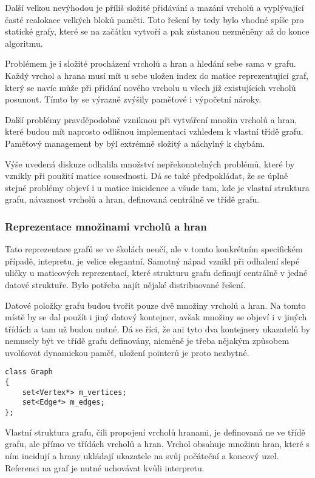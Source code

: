 \documentclass[11pt,twoside,a4paper]{book}
\begin{document}
Další velkou nevýhodou je příliš složité přidávání a mazání vrcholů a vyplývající časté realokace velkých bloků paměti. Toto řešení by tedy bylo vhodné spíše pro statické grafy, které se na začátku vytvoří a pak zůstanou nezměněny až do konce algoritmu.

Problémem je i složité procházení vrcholů a hran a hledání sebe sama v grafu. Každý vrchol a hrana musí mít u sebe uložen index do matice reprezentující graf, který se navíc může při přidání nového vrcholu u všech již existujících vrcholů posunout. Tímto by se výrazně zvýšily paměťové i výpočetní nároky.

Další problémy pravděpodobně vzniknou při vytváření množin vrcholů a hran, které budou mít naprosto odlišnou implementaci vzhledem k vlastní třídě grafu. Paměťový management by býl extrémně složitý a náchylný k chybám.

Výše uvedená diskuze odhalila množství nepřekonatelných problémů, které by vznikly při použití matice sousednosti. Dá se také předpokládat, že se úplně stejné problémy objeví i u matice inicidence a všude tam, kde je vlastní struktura grafu, návaznost vrcholů a hran, definovaná centrálně ve třídě grafu.


\subsubsection{Reprezentace množinami vrcholů a hran}

Tato reprezentace grafů se ve školách neučí, ale v tomto konkrétním specifickém případě, intepretu, je velice elegantní. Samotný nápad vznikl při odhalení slepé uličky u maticových reprezentací, které strukturu grafu definují centrálně v jedné datové struktuře. Bylo potřeba najít nějaké distribuované řešení.

Datové položky grafu budou tvořit pouze dvě množiny vrcholů a hran. Na tomto místě by se dal použít i jiný datový kontejner, avšak množiny se objeví i v jiných třídách a tam už budou nutné. Dá se říci, že ani tyto dva kontejnery ukazatelů by nemusely být ve třídě grafu definovány, nicméně je třeba nějakým způsobem uvolňovat dynamickou paměť, uložení pointerů je proto nezbytné.

\begin{verbatim}
class Graph
{
    set<Vertex*> m_vertices;
    set<Edge*> m_edges;
};
\end{verbatim}

Vlastní struktura grafu, čili propojení vrcholů hranami, je definovaná ne ve třídě grafu, ale přímo ve třídách vrcholů a hran. Vrchol obsahuje množinu hran, které s ním incidují a hrany ukládají ukazatele na svůj počáteční a koncový uzel. Referenci na graf je nutné uchovávat kvůli interpretu.
\end{document}
